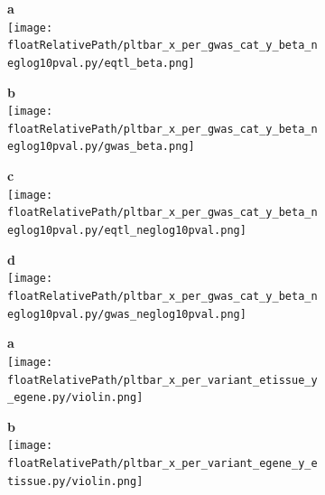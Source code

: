 \begin{figure}[h!]

    \begin{subfigure}[]{.50\textwidth}
        \textbf{a}
        \\
        \texttt{[image: \\floatRelativePath/pltbar\_x\_per\_gwas\_cat\_y\_beta\_neglog10pval.py/eqtl\_beta.png]}
    \end{subfigure}
    \begin{subfigure}[]{.50\textwidth}
        \textbf{b}
        \\
        \texttt{[image: \\floatRelativePath/pltbar\_x\_per\_gwas\_cat\_y\_beta\_neglog10pval.py/gwas\_beta.png]}
    \end{subfigure}

    \begin{subfigure}[]{.50\textwidth}
        \textbf{c}
        \\
        \texttt{[image: \\floatRelativePath/pltbar\_x\_per\_gwas\_cat\_y\_beta\_neglog10pval.py/eqtl\_neglog10pval.png]}
    \end{subfigure}
    \begin{subfigure}[]{.50\textwidth}
        \textbf{d}
        \\
        \texttt{[image: \\floatRelativePath/pltbar\_x\_per\_gwas\_cat\_y\_beta\_neglog10pval.py/gwas\_neglog10pval.png]}
    \end{subfigure}
    \caption{}

\end{figure}

%
%

\begin{figure}[h!]
    \centering
    \begin{subfigure}[]{.45\textwidth}
        \textbf{a}
        \\
        \texttt{[image: \\floatRelativePath/pltbar\_x\_per\_variant\_etissue\_y\_egene.py/violin.png]}
    \end{subfigure}
    \begin{subfigure}[]{.45\textwidth}
        \textbf{b}
        \\
        \texttt{[image: \\floatRelativePath/pltbar\_x\_per\_variant\_egene\_y\_etissue.py/violin.png]}
    \end{subfigure}
    \caption{} \label{fig:gwas_egene_etisue_per_variant}
\end{figure}

